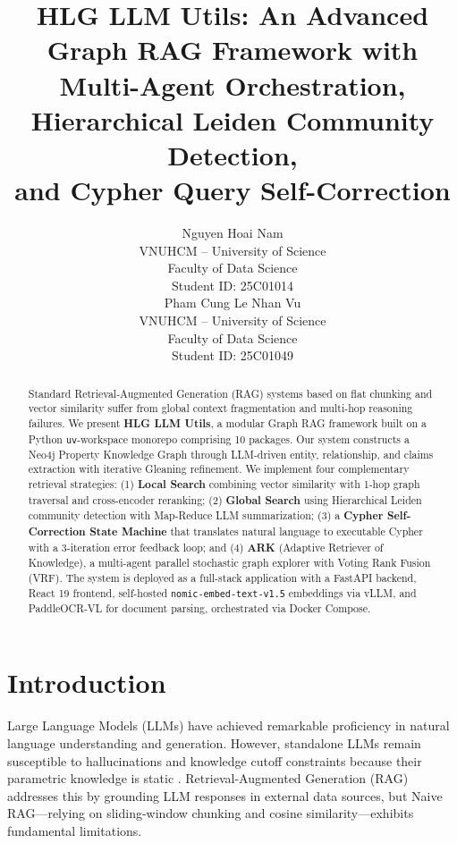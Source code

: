\documentclass[11pt]{article}
\title{HLG LLM Utils: An Advanced Graph RAG Framework with\\Multi-Agent Orchestration, Hierarchical Leiden Community Detection,\\and Cypher Query Self-Correction}
\author{Nguyen Hoai Nam \\
  VNUHCM -- University of Science \\
  Faculty of Data Science \\
  Student ID: 25C01014 \\
  \And
  Pham Cung Le Nhan Vu \\
  VNUHCM -- University of Science \\
  Faculty of Data Science \\
  Student ID: 25C01049 \\}
\begin{document}
\maketitle

\begin{abstract}
Standard Retrieval-Augmented Generation (RAG) systems based on flat chunking and vector similarity suffer from global context fragmentation and multi-hop reasoning failures. We present \textbf{HLG LLM Utils}, a modular Graph RAG framework built on a Python \texttt{uv}-workspace monorepo comprising 10 packages. Our system constructs a Neo4j Property Knowledge Graph through LLM-driven entity, relationship, and claims extraction with iterative Gleaning refinement. We implement four complementary retrieval strategies: (1) \textbf{Local Search} combining vector similarity with 1-hop graph traversal and cross-encoder reranking; (2) \textbf{Global Search} using Hierarchical Leiden community detection with Map-Reduce LLM summarization; (3) a \textbf{Cypher Self-Correction State Machine} that translates natural language to executable Cypher with a 3-iteration error feedback loop; and (4) \textbf{ARK} (Adaptive Retriever of Knowledge), a multi-agent parallel stochastic graph explorer with Voting Rank Fusion (VRF). The system is deployed as a full-stack application with a FastAPI backend, React 19 frontend, self-hosted \texttt{nomic-embed-text-v1.5} embeddings via vLLM, and PaddleOCR-VL for document parsing, orchestrated via Docker Compose.
\end{abstract}

\section{Introduction}

Large Language Models (LLMs) have achieved remarkable proficiency in natural language understanding and generation. However, standalone LLMs remain susceptible to hallucinations and knowledge cutoff constraints because their parametric knowledge is static \citep{lewis2020rag}. Retrieval-Augmented Generation (RAG) addresses this by grounding LLM responses in external data sources, but Naive RAG---relying on sliding-window chunking and cosine similarity---exhibits fundamental limitations.
\end{document}
